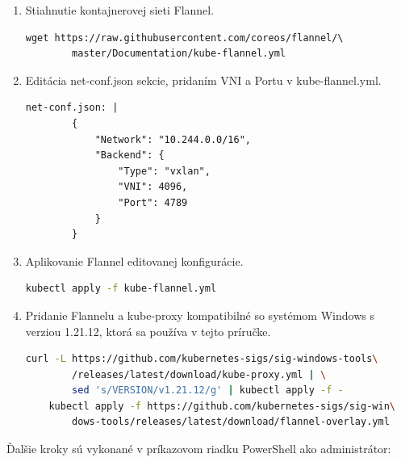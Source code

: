 \begin{enumerate}
\item{\noindent Stiahnutie kontajnerovej sieti Flannel.
\begin{lstlisting}[basicstyle=\footnotesize]
    wget https://raw.githubusercontent.com/coreos/flannel/\
        master/Documentation/kube-flannel.yml
    \end{lstlisting}}
\item{\noindent Editácia net-conf.json sekcie, pridaním VNI a Portu v kube-flannel.yml.
\begin{lstlisting}[basicstyle=\footnotesize]
    net-conf.json: |
        {
            "Network": "10.244.0.0/16",
            "Backend": {
                "Type": "vxlan",
                "VNI": 4096,
                "Port": 4789
            }
        }
    \end{lstlisting}}
\item{\noindent Aplikovanie Flannel editovanej konfigurácie.
\begin{lstlisting}[language=Bash,basicstyle=\footnotesize]
    kubectl apply -f kube-flannel.yml
    \end{lstlisting}}
\item{\noindent Pridanie Flannelu a kube-proxy kompatibilné so systémom Windows s verziou 1.21.12, ktorá sa používa v tejto príručke.
\begin{lstlisting}[language=Bash,basicstyle=\footnotesize]
    curl -L https://github.com/kubernetes-sigs/sig-windows-tools\
        /releases/latest/download/kube-proxy.yml | \
        sed 's/VERSION/v1.21.12/g' | kubectl apply -f -
    kubectl apply -f https://github.com/kubernetes-sigs/sig-win\
        dows-tools/releases/latest/download/flannel-overlay.yml
    \end{lstlisting}}
\end{enumerate}

\noindent Ďalšie kroky sú vykonané v príkazovom riadku PowerShell ako administrátor:


